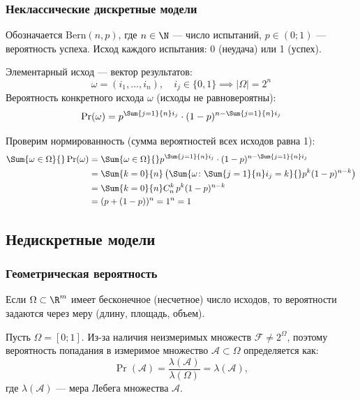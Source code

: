 \subsubsection{Неклассические дискретные модели}

\begin{definition}
    Обозначается $\mathrm{Bern}(n, p)$, где $n \in \N$ --- число испытаний, $p \in (0; 1)$ --- вероятность успеха. Исход каждого испытания: 0 (неудача) или 1 (успех).
\end{definition}

Элементарный исход --- вектор результатов:
\[
    \omega = (i_1, \dots , i_n), \quad i_j \in \{0, 1\} \implies |\Omega| = 2^n
\]
Вероятность конкретного исхода $\omega$ (исходы не равновероятны):
\[
    \Pr(\omega) = p^{\Sum{j=1}{n} i_j} \cdot (1 - p)^{n - \Sum{j=1}{n} i_j}
\]

Проверим нормированность (сумма вероятностей всех исходов равна 1):
\[
\begin{aligned}
    \Sum{\omega \in \Omega}{} \Pr(\omega) &= \Sum{\omega \in \Omega}{} p^{\Sum{j=1}{n} i_j} \cdot (1 - p)^{n - \Sum{j=1}{n} i_j} \\
    &= \Sum{k = 0}{n} \left( \Sum{\omega \colon \Sum{j = 1}{n} i_j = k}{} p^k (1-p)^{n-k} \right) \\
    &= \Sum{k = 0}{n} C_n^k \, p^k (1-p)^{n-k} \\
    &= (p + (1 - p))^n = 1^n = 1
\end{aligned}
\]

\subsection{Недискретные модели}
\subsubsection{Геометрическая вероятность}

Если $\Omega \subset \R^m$ имеет бесконечное (несчетное) число исходов, то вероятности задаются через меру (длину, площадь, объем).

\begin{example}
    Пусть $\Omega = [0; 1]$.
    Из-за наличия неизмеримых множеств $\mathcal{F} \neq 2^{\Omega}$, поэтому вероятность попадания в измеримое множество $\mathcal{A} \subset \Omega$ определяется как:
    \[
        \Pr(\mathcal{A}) = \frac{\lambda(\mathcal{A})}{\lambda(\Omega)} = \lambda(\mathcal{A}),
    \]
    где $\lambda(\mathcal{A})$ --- мера Лебега множества $\mathcal{A}$.
\end{example}

